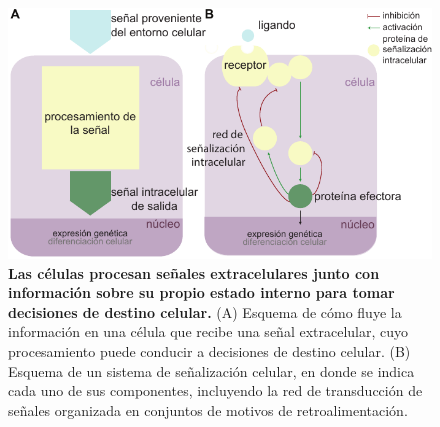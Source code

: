 \documentclass[./main.tex]{subfiles}
\begin{document}
 \begin{figure}
    \centering
    \includegraphics[width=1\columnwidth]{figures/chapter1/C1_signalling.pdf} 
    \caption{\textbf{Las células procesan señales extracelulares junto con información sobre su propio estado interno para tomar decisiones de destino celular.} (A)  Esquema de cómo fluye la información en una célula que recibe una señal extracelular, cuyo procesamiento puede conducir a decisiones de destino celular. (B) Esquema de un sistema de señalización celular, en donde se indica cada uno de sus componentes, incluyendo la red de transducción de señales organizada en conjuntos de motivos de retroalimentación.}
    \label{C1_fig:signalling}
\end{figure}
\end{document}
